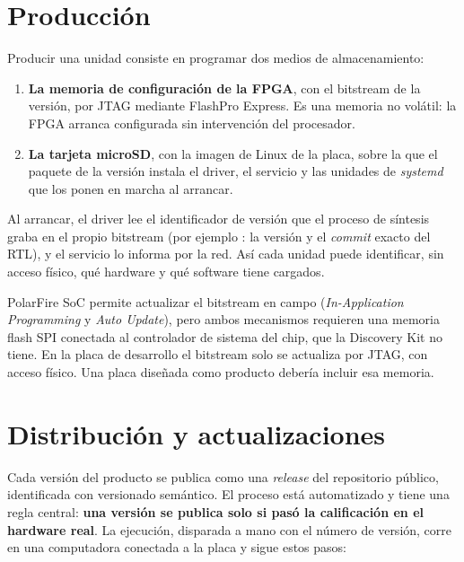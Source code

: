 \section{Producción}
\label{sec:produccion}

Producir una unidad consiste en programar dos medios de almacenamiento:

\begin{enumerate}
  \item \textbf{La memoria de configuración de la FPGA}, con el bitstream de
    la versión, por JTAG mediante FlashPro Express. Es una memoria no volátil:
    la FPGA arranca configurada sin intervención del procesador.
  \item \textbf{La tarjeta microSD}, con la imagen de Linux de la placa,
    sobre la que el paquete de la versión instala el driver, el servicio y
    las unidades de \emph{systemd} que los ponen en marcha al arrancar.
\end{enumerate}

Al arrancar, el driver lee el identificador de versión que el proceso de
síntesis graba en el propio bitstream (por ejemplo : la
versión y el \emph{commit} exacto del RTL), y el servicio lo informa por la
red. Así cada unidad puede identificar, sin acceso físico, qué hardware y qué
software tiene cargados.

\begin{advertencia}
PolarFire SoC permite actualizar el bitstream en campo (\emph{In-Application
Programming} y \emph{Auto Update}), pero ambos mecanismos requieren una
memoria flash SPI conectada al controlador de sistema del chip, que la
Discovery Kit no tiene. En la placa de desarrollo el bitstream solo se
actualiza por JTAG, con acceso físico. Una placa diseñada como producto
debería incluir esa memoria.
\end{advertencia}

\section{Distribución y actualizaciones}
\label{sec:distribucion}

Cada versión del producto se publica como una \emph{release} del repositorio
público, identificada con versionado semántico. El proceso está
automatizado y tiene una regla central: \textbf{una versión se publica solo
si pasó la calificación en el hardware real}. La ejecución, disparada a mano
con el número de versión, corre en una computadora conectada a la placa y
sigue estos pasos:

